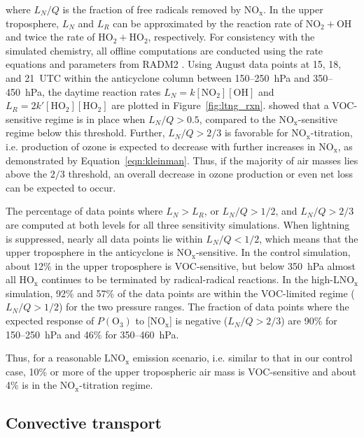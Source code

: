 \noindent where $L_N/Q$ is the fraction of free radicals removed by NO$_\mathrm{x}$.
In the upper troposphere, $L_N$ and $L_R$ can be approximated by the
reaction rate of $\mathrm{NO_2+OH}$ and twice the rate of
$\mathrm{HO_2+HO_2}$, respectively. For consistency with the simulated chemistry,
all offline computations are conducted using the rate equations and parameters from RADM2
\citep[][and references therein]{Stockwell:1990ez}. Using August data points
at 15, 18, and 21~UTC within the anticyclone column between 150--250~hPa
and 350--450~hPa, the daytime reaction rates $L_N=k\mathrm{[NO_2][OH]}$ and
$L_R=2k'\mathrm{[HO_2][HO_2]}$ are plotted in Figure~\ref{fig:ltng_rxn}.
\citet{Kleinman:2001fk} showed that
a VOC-sensitive regime is in place when $L_N/Q>0.5$, compared to the NO$_\mathrm{x}$-sensitive regime
below this threshold. Further, $L_N/Q>2/3$ is favorable for NO$_\mathrm{x}$-titration,
i.e. production of ozone is expected to decrease with further increases in
NO$_\mathrm{x}$, as demonstrated by Equation~\ref{eqn:kleinman}. Thus,
if the majority of air masses lies above the $2/3$ threshold, an overall decrease
in ozone production or even net loss can be expected to occur.

The percentage of data points where $L_N>L_R$, or $L_N/Q>1/2$, and
$L_N/Q>2/3$ are computed at both levels for all three sensitivity simulations. When
lightning is suppressed, nearly all data points lie within $L_N/Q<1/2$,
which means that the upper troposphere in the anticyclone is NO$_\mathrm{x}$-sensitive.
In the control simulation, about 12\% in the upper troposphere is VOC-sensitive,
but below 350~hPa almost all HO$_\mathrm{x}$ continues to
be terminated by radical-radical reactions. In the high-LNO$_\mathrm{x}$
simulation, 92\% and 57\% of the data points are within the VOC-limited regime
($L_N/Q>1/2$) for the two pressure ranges. The fraction of data points
where the expected response of $P(\mathrm{O_3})$ to [NO$_\mathrm{x}$]
is negative ($L_N/Q>2/3$) are 90\% for 150--250~hPa and 46\% for
350--460~hPa.

Thus, for a reasonable $\mathrm{LNO_x}$ emission scenario, i.e. similar to that
in our control case, 10\% or more of the upper tropospheric air mass is
VOC-sensitive and about 4\% is in the $\mathrm{NO_x}$-titration regime.

\subsection{Convective transport}

